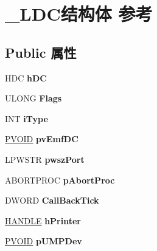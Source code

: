 \hypertarget{struct___l_d_c}{}\section{\+\_\+\+L\+D\+C结构体 参考}
\label{struct___l_d_c}
\subsection*{Public 属性}
\begin{DoxyCompactItemize}
\item 
\mbox{\label{struct___l_d_c_aca94c2f6b630a7f0bcd5a3ae6807c85b}} 
H\+DC {\bfseries h\+DC}
\item 
\mbox{\label{struct___l_d_c_ad3e460580c9945fe9434caf28163cf23}} 
U\+L\+O\+NG {\bfseries Flags}
\item 
\mbox{\label{struct___l_d_c_a9e61a08b96c6a77d6405f66a63d7d6b1}} 
I\+NT {\bfseries i\+Type}
\item 
\mbox{\label{struct___l_d_c_a3bea5060386294488e05c0cce25ea8dc}} 
\hyperlink{interfacevoid}{P\+V\+O\+ID} {\bfseries pv\+Emf\+DC}
\item 
\mbox{\label{struct___l_d_c_ad1e6a47555343104c6e76274c7dfff70}} 
L\+P\+W\+S\+TR {\bfseries pwsz\+Port}
\item 
\mbox{\label{struct___l_d_c_aab4402ed25903c9242a55b0bda9149d7}} 
A\+B\+O\+R\+T\+P\+R\+OC {\bfseries p\+Abort\+Proc}
\item 
\mbox{\label{struct___l_d_c_a3d0df6147b862e73207e4ec37ff38fec}} 
D\+W\+O\+RD {\bfseries Call\+Back\+Tick}
\item 
\mbox{\label{struct___l_d_c_a237e76e0171af08492fa27390ce1395d}} 
\hyperlink{interfacevoid}{H\+A\+N\+D\+LE} {\bfseries h\+Printer}
\item 
\mbox{\label{struct___l_d_c_a66e7ca2ffc83eec3d5ab08e98296bd93}} 
\hyperlink{interfacevoid}{P\+V\+O\+ID} {\bfseries p\+U\+M\+P\+Dev}
\item 
\mbox{\label{struct___l_d_c_a593c44e5d497eba7a26413ac5972be69}} 

\end{DoxyCompactItemize}
